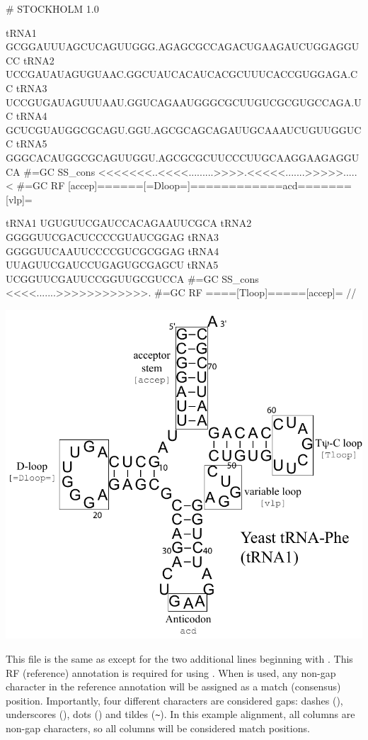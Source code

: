 \vspace{1em}
\begin{minipage}{4.0in}
\begin{sreoutput}[xleftmargin=0em]
# STOCKHOLM 1.0

tRNA1             GCGGAUUUAGCUCAGUUGGG.AGAGCGCCAGACUGAAGAUCUGGAGGUCC
tRNA2             UCCGAUAUAGUGUAAC.GGCUAUCACAUCACGCUUUCACCGUGGAGA.CC
tRNA3             UCCGUGAUAGUUUAAU.GGUCAGAAUGGGCGCUUGUCGCGUGCCAGA.UC
tRNA4             GCUCGUAUGGCGCAGU.GGU.AGCGCAGCAGAUUGCAAAUCUGUUGGUCC
tRNA5             GGGCACAUGGCGCAGUUGGU.AGCGCGCUUCCCUUGCAAGGAAGAGGUCA
#=GC SS_cons      <<<<<<<..<<<<.........>>>>.<<<<<.......>>>>>.....<
#=GC RF           [accep]======[=Dloop=]============acd=======[vlp]=

tRNA1             UGUGUUCGAUCCACAGAAUUCGCA
tRNA2             GGGGUUCGACUCCCCGUAUCGGAG
tRNA3             GGGGUUCAAUUCCCCGUCGCGGAG
tRNA4             UUAGUUCGAUCCUGAGUGCGAGCU
tRNA5             UCGGUUCGAUUCCGGUUGCGUCCA
#=GC SS_cons      <<<<.......>>>>>>>>>>>>.
#=GC RF           ====[Tloop]=====[accep]=
//
\end{sreoutput}
\end{minipage}
\begin{minipage}{1.5in}
\includegraphics[scale=0.4]{Figures/trna1-DF6280-hand}
\end{minipage}
\vspace{1em}

This file is the same as  except for the two
additional lines beginning with . This RF (reference)
annotation is required for using . When 
is used, any non-gap character in the reference annotation will be
assigned as a match (consensus) position. Importantly, four different
characters are considered gaps: dashes (\otext{-}), underscores
(\otext{\_}), dots () and tildes (\verb+~+). In this example
alignment, all columns are non-gap characters, so all columns will be
considered match positions.

